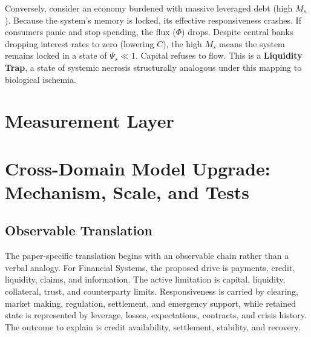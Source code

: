 \documentclass[11pt,a4paper]{article}
\begin{document}
Conversely, consider an economy burdened with massive leveraged debt (high $M_s$). Because the system's memory is locked, its effective responsiveness crashes. If consumers panic and stop spending, the flux ($\Phi$) drops. Despite central banks dropping interest rates to zero (lowering $C$), the high $M_s$ means the system remains locked in a state of $\Psi_s \ll 1$. Capital refuses to flow. This is a \textbf{Liquidity Trap}, a state of systemic necrosis structurally analogous under this mapping to biological ischemia.



\section{Measurement Layer}

\section{Cross-Domain Model Upgrade: Mechanism, Scale, and Tests}

\subsection{Observable Translation}

The paper-specific translation begins with an observable chain rather than a
verbal analogy. For Financial Systems, the proposed drive is payments, credit, liquidity, claims, and information.
The active limitation is capital, liquidity, collateral, trust, and counterparty limits. Responsiveness is carried by
clearing, market making, regulation, settlement, and emergency support, while retained state is represented by
leverage, losses, expectations, contracts, and crisis history. The outcome to explain is credit availability, settlement, stability, and recovery.
\end{document}
